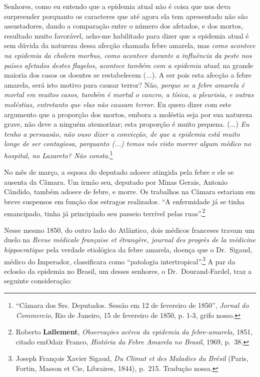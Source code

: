 Senhores, como eu entendo que a epidemia atual não é coisa que nos deva
surpreender porquanto os caracteres que até agora ela tem apresentado
não são assustadores, dando a comparação entre o número dos afetados, e
dos mortos, resultado muito favorável, acho-me habilitado para dizer que
a epidemia atual é sem dúvida da natureza dessa afecção chamada febre
amarela, mas \emph{como acontece na epidemia da cholera morbus, como
acontece durante a influência da peste nos países afetados destes
flagelos, acontece também com a epidemia atual}; na grande maioria dos
casos os doentes se restabelecem (...). A ser pois esta afecção a febre
amarela, será isto motivo para causar terror? Não, \emph{porque se a
febre amarela é mortal em muitos casos, também é mortal o cancro, a
tísica, a pleurisia, e outras moléstias, entretanto que elas não causam
terror}. Eu quero dizer com este argumento que a proporção dos mortos,
embora a moléstia seja por sua natureza grave, não deve a ninguém
atemorizar; esta proporção é muito pequena. (...) \emph{Eu tenho a
persuasão, não ouso dizer a convicção, de que a epidemia está muito
longe de ser contagiosa, porquanto (...) temos nós visto morrer algum
médico no hospital, no Lazareto? Não consta}.\footnote{``Câmara dos Srs.
  Deputados. Sessão em 12 de fevereiro de 1850'', \emph{Jornal do
  Commercio}, Rio de Janeiro, 15 de fevereiro de 1850, p. 1-3, grifo
  nosso.}

No mês de março, a esposa do deputado adoece atingida pela febre e ele
se ausenta da Câmara. Um irmão seu, deputado por Minas Gerais, Antonio
Cândido, também adoece de febre, e morre. Os trabalhos na Câmara
estariam em breve suspensos em função dos estragos realizados. ``A
enfermidade já se tinha emancipado, tinha já principiado seu passeio
terrível pelas ruas''.\footnote{Roberto \textbf{Lallement},
  \emph{Observações acêrca da epidemia da febre-amarela}, 1851, citado
  emOdair Franco, \emph{História da Febre Amarela no Brasil}, 1969,
  p.~38.}

Nesse mesmo 1850, do outro lado do Atlântico, dois médicos franceses
travam um duelo na \emph{Revue médicale française et étrangère, journal
des progrès de la médicine hippocratique} pela verdade etiológica da
febre amarela, doença que o Dr.~Sigaud, médico do Imperador,
classificara como ``patologia intertropical''.\footnote{Joseph François
  Xavier Sigaud, \emph{Du Climat et des Maladies du Brésil} (Paris,
  Fortin, Masson et Cie, Libraires, 1844), p.~215. Tradução nossa.} A
par da eclosão da epidemia no Brasil, um desses senhores, o
Dr.~Dourand-Fardel, traz a seguinte consideração:

